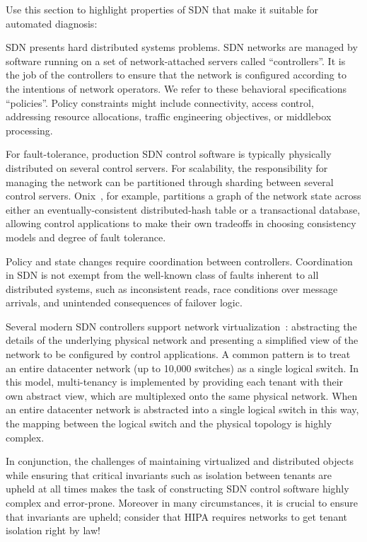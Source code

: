Use this section to highlight properties of SDN that make it suitable for automated diagnosis:

SDN presents hard distributed systems problems. SDN networks are managed by software running on a set of network-attached
servers called ``controllers''. It is the job of the controllers to ensure
that the network is configured according to the intentions of network
operators. We refer to these behavioral specifications
``policies''. Policy constraints might include connectivity, access control,
addressing resource allocations, traffic engineering objectives, or middlebox
processing.

For fault-tolerance, production SDN control software is typically physically
distributed on several control servers. For scalability, the responsibility for
managing the network can be partitioned through sharding between
several control servers. Onix~\cite{onix}, for example, partitions a
graph of the network state across either an eventually-consistent
distributed-hash table or a
transactional database, allowing control applications to make their own
tradeoffs in choosing consistency models and degree of fault tolerance.

Policy and state changes require coordination between controllers.
Coordination in SDN is not exempt from the well-known class of faults
inherent to all distributed systems, such as
inconsistent reads, race conditions over message arrivals, and
unintended consequences of failover logic.

Several modern SDN controllers support network
virtualization~\cite{bigswitch,nicirahomepage,contextream}:
abstracting the
details of the underlying physical network and presenting a
simplified view of the network to be configured by control applications.
A common pattern is to treat an entire datacenter network (up to
10,000 switches) as a single logical switch.
In this model, multi-tenancy is implemented by providing each tenant with their
own abstract view, which are multiplexed onto the same physical network.
When an entire datacenter network is
abstracted into a single logical switch in this way, the mapping between the logical switch
and the physical topology is highly complex.

In conjunction, the challenges of maintaining virtualized and distributed
objects while ensuring that critical invariants such as isolation between
tenants are upheld at all times makes the task of constructing
SDN control software highly complex and error-prone.
Moreover in many circumstances, it is crucial to ensure that invariants are
upheld; consider that HIPA requires networks to get tenant isolation right by law!

